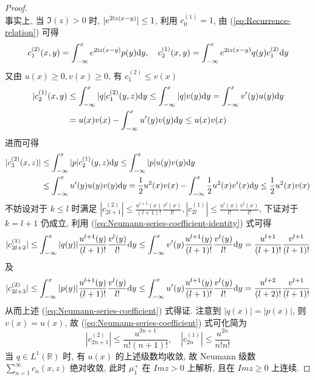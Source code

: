 \begin{proof}
\begin{equation}
  \end{equation}
  事实上, 当 $ \Im(z) > 0 $ 时, $ |e^{2 \mathrm{i} z (x-y)} | \leq 1 $, 利用 $ c_{0}^{(1)} = 1 $, 由 (\ref{eq:Recurrence-relation}) 可得
  \begin{equation}
    c_{1}^{(2)}(x,y) = \int_{-\infty}^{x} e^{2 \mathrm{i} z(x-y)} p(y) \mathrm{d} y, \quad c_{2}^{(1)}(x,y) = \int_{-\infty}^{x} e^{2 \mathrm{i} z(x-y)} q(y) c_{1}^{(2)} \mathrm{d} y
  \end{equation}
  又由 $ u(x) \geq 0, v(x) \geq 0 $, 有 $ c_{1}^{(2)} \leq v(x) $
  \begin{equation}
    \begin{aligned}
      |  c_{2}^{(1)}(x,y) &\leq \int_{-\infty}^{x} | q |  c_{1}^{(2)}(y,z) \mathrm{d} y \leq  \int_{-\infty}^{x} | q | v(y) \mathrm{d} y = \int_{-\infty}^{x} v'(y) u(y) \mathrm{d} y \\
      &= u(x) v(x) - \int_{-\infty}^{x} u'(y) v(y) \mathrm{d} y \leq u(x)v(x)
    \end{aligned}
  \end{equation}
  进而可得
  \begin{equation}
    \begin{aligned}
      | c_{3}^{(2)}(x,z) | &\leq \int_{-\infty}^{x} | p | c_{2}^{(1)}(y,z) \mathrm{d} y \leq \int_{-\infty}^{x} | p | u(y) v(y) \mathrm{d} y \\
      &\leq \int_{-\infty}^{x} u'(y) u(y) v(y) \mathrm{d} y = \frac{1}{2}u^2(x) v(x) - \int_{-\infty}^{x} \frac{1}{2}u^2(x) v'(x)  \mathrm{d} y \leq \frac{1}{2} u^{2}(x) v(x)
    \end{aligned}
  \end{equation}
  不妨设对于 $ k \leq l $ 时满足 $  | c_{2l+1}^{(2)} | \leq \frac{u^{l+1}(x)}{(l+1)!} \frac{v^{l}(x)}{l!}, | c_{2l}^{(1)} | \leq \frac{u^{l}(x)}{l!} \frac{v^{l}(x)}{l!} $, 下证对于 $ k = l +1 $ 仍成立, 利用 (\ref{eq:Neumann-series-coefficient-identity}) 式可得
    \begin{equation}
      | c_{2l+2}^{(1)} | \leq \int_{-\infty}^{x} | q(y) | \frac{u^{l+1}(y)}{(l+1)!} \frac{v^{l}(y)}{l!} \mathrm{d} y \leq \int_{-\infty}^{x} v'(y) \frac{u^{l+1}(y)}{(l+1)!} \frac{v^{l}(y)}{l!} \mathrm{d} y = \frac{u^{l+1}}{(l+1)!}  \frac{v^{l+1}}{(l+1)!} 
    \end{equation}
    及
    \begin{equation}
      | c_{2l+3}^{(2)} | \leq \int_{-\infty}^{x} | p(y) | \frac{u^{l+1}(y)}{(l+1)!} \frac{v^{l}(y)}{l!} \mathrm{d} y \leq \int_{-\infty}^{x} u'(y) \frac{u^{l+1}(y)}{(l+1)!} \frac{v^{l}(y)}{l!} \mathrm{d} y = \frac{u^{l+2}}{(l+2)!}  \frac{v^{l+1}}{(l+1)!}
    \end{equation}
  从而上述 (\ref{eq:Neumann-series-coefficient}) 式得证. 注意到 $ | q(x) |  = | p(x) |$, 则 $ v(x) = u(x) $, 故 (\ref{eq:Neumann-series-coefficient}) 式可化简为
  \begin{equation}
    | c_{2n+1}^{(2)} | \leq \frac{u^{2n+1}}{n!(n+1)!}, \quad | c_{2n}^{(1)} | \leq \frac{u^{2n}}{n!n!}
  \end{equation}
  当 $ q \in L^1(\mathbb{R}) $ 时, 有 $ u(x) $ 的上述级数均收敛, 故 Neumann 级数 $ \sum_{n=1}^{\infty} c_{n}(x,z) $ 绝对收敛, 此时 $ \mu_{1}^{+} $ 在 $ Im z > 0 $ 上解析, 且在 $ Im z \geq 0 $ 上连续.


\end{proof}

